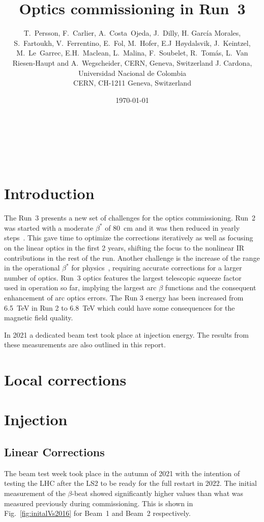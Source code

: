 \documentclass{cernatsnote}
\title{Optics commissioning in Run~3}
\author{T.~Persson,  F.~Carlier, A.~Costa~Ojeda, J.~Dilly, H. Garc\'ia Morales, S.~Fartoukh,  V.~Ferrentino, E.~Fol, M.~Hofer, E.J~Høydalsvik, J.~Keintzel, M.~Le~Garrec, E.H.~Maclean, L.~Malina,  F.~Soubelet, R.~Tom\'as, L.~Van Riesen-Haupt and A.~Wegscheider, CERN, Geneva, Switzerland 
  J. Cardona, Universidad Nacional de Colombia \; \\		
	CERN, CH-1211 Geneva, Switzerland
}
\date{\today}
\begin{document}
\maketitle

\begin{abstract}

\end{abstract}
\\ \\ \\ 

\begingroup
\color{black}
\tableofcontents
\endgroup

\pagebreak

\section{Introduction}

The Run~3 presents a new set of challenges for the optics commissioning. Run~2 was started with a moderate $\beta^*$ of 80~cm and it was then reduced in yearly steps~\cite{ACcom, ewen2019jour}. This gave time to optimize the corrections iteratively as well as focusing on the linear optics in the first 2 years, shifting the focus to the nonlinear IR contributions in the rest of the run. Another challenge is the increase of the range in the operational $\beta^*$ for physics~\cite{run3}, requiring accurate corrections for a larger number of optics. Run~3 optics features the largest telescopic squeeze factor~\cite{ats_stephane} used in operation so far, implying the largest arc $\beta$ functions and the consequent enhancement of arc optics errors.
The Run 3 energy has been increased from 6.5~TeV in Run 2 to 6.8~TeV which could have some consequences for the magnetic field quality.

In 2021 a dedicated beam test took place at injection energy. The results from these measurements are also outlined in this report. 

\section{Local corrections}
\section{Injection}
\subsection{Linear Corrections}
The beam test week took place in the autumn of 2021 with the intention of testing the LHC after the LS2 to be ready for the full restart in 2022.
The initial measurement of the $\beta$-beat showed significantly higher values than what was measured previously during commissioning. This is shown in Fig.~\ref{fig:initalVs2016} for Beam~1 and Beam~2 respectively.  
\end{document}
